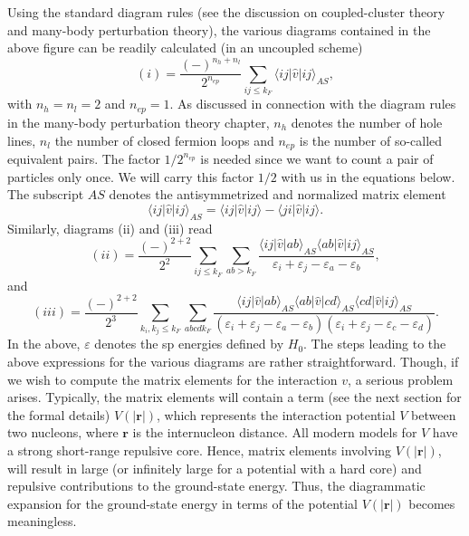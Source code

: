 Using the standard diagram rules (see the discussion on
coupled-cluster theory and many-body perturbation theory), the various
diagrams contained in the above figure can be readily calculated (in
an uncoupled scheme)
\begin{equation}
   (i)=\frac{(-)^{n_h+n_l}}{2^{n_{ep}}}\sum_{ij\leq k_F}
       \langle ij\vert\hat{v}\vert ij\rangle_{AS},
\end{equation}
with $n_h=n_l=2$ and $n_{ep}=1$. As discussed in connection with the
diagram rules in the many-body perturbation theory chapter, $n_h$
denotes the number of hole lines, $n_l$ the number of closed fermion
loops and $n_{ep}$ is the number of so-called equivalent pairs.  The
factor $1/2^{n_{ep}}$ is needed since we want to count a pair of
particles only once. We will carry this factor $1/2$ with us in the
equations below.  The subscript $AS$ denotes the antisymmetrized and
normalized matrix element
\begin{equation}
     \langle ij\vert\hat{v}\vert ij\rangle_{AS}=\langle ij \vert\hat{v}\vert ij\rangle-
     \langle ji \vert\hat{v}\vert ij\rangle.
\end{equation}
Similarly, diagrams (ii) and (iii) read
\begin{equation}
   (ii)=\frac{(-)^{2+2}}{2^2}\sum_{ij\leq k_F}\sum_{ab>k_F}
   \frac{\langle ij\vert\hat{v}\vert ab\rangle_{AS}
   \langle ab\vert\hat{v}\vert ij\rangle_{AS}}
   {\varepsilon_i+\varepsilon_j-\varepsilon_a-\varepsilon_b},
\end{equation}
and
\begin{equation}
   (iii)=\frac{(-)^{2+2}}{2^3}\sum_{k_i,k_j\leq k_F}\sum_{abcdk_F}
   \frac{\langle ij\vert\hat{v}\vert ab\rangle_{AS}
   \langle ab\vert\hat{v}\vert cd\rangle_{AS}
   \langle cd\vert\hat{v}\vert ij\rangle_{AS}}
   {(\varepsilon_i+\varepsilon_j-\varepsilon_a-\varepsilon_b)
   (\varepsilon_i+\varepsilon_j-\varepsilon_c-\varepsilon_d)}.
\end{equation}
In the above, $\varepsilon$ denotes the sp energies defined by
$H_0$.
The steps leading to the above expressions for the various
diagrams are rather straightforward. Though, if we wish to compute the
matrix elements for the interaction $v$, a serious problem
arises. Typically, the matrix elements will contain a term
(see the next section for the formal details) $V(|{\mathbf r}|)$, which
represents the interaction potential $V$ between two nucleons, where
${\mathbf r}$ is the internucleon distance.
All modern models
for $V$ have a strong short-range repulsive core. Hence,
matrix elements involving $V(|{\mathbf r}|)$, will result in large
(or infinitely large for a potential with a hard core)
and repulsive contributions to the ground-state energy. Thus, the
diagrammatic expansion for the ground-state energy in terms of the
potential $V(|{\mathbf r}|)$ becomes meaningless.

